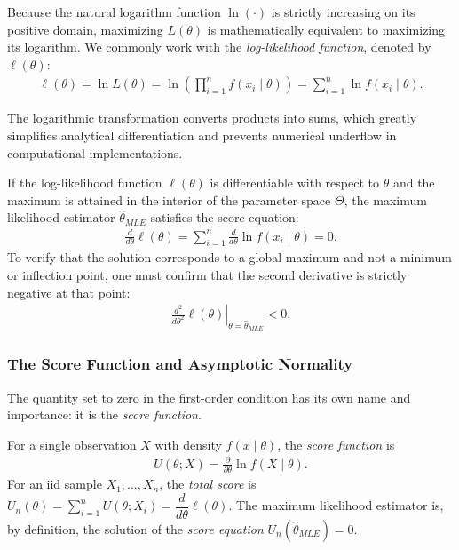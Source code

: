 Because the natural logarithm function $\ln(\cdot)$ is strictly increasing on its positive domain, maximizing $L(\theta)$ is mathematically equivalent to maximizing its logarithm. We commonly work with the \emph{log-likelihood function}, denoted by $\ell(\theta)$:
\begin{align}
	\ell(\theta) = \ln L(\theta) = \ln \left( \prod_{i=1}^n f(x_i \mid \theta) \right) = \sum_{i=1}^n \ln f(x_i \mid \theta).
	\label{eq:log_verosimilitud}
\end{align}

The logarithmic transformation converts products into sums, which greatly simplifies analytical differentiation and prevents numerical underflow in computational implementations.

\begin{teorema}
	If the log-likelihood function $\ell(\theta)$ is differentiable with respect to $\theta$ and the maximum is attained in the interior of the parameter space $\Theta$, the maximum likelihood estimator $\hat{\theta}_{MLE}$ satisfies the score equation:
	\begin{align}
		\frac{d}{d\theta} \ell(\theta) = \sum_{i=1}^n \frac{d}{d\theta} \ln f(x_i \mid \theta) = 0.
		\label{eq:mle_score}
	\end{align}
	To verify that the solution corresponds to a global maximum and not a minimum or inflection point, one must confirm that the second derivative is strictly negative at that point:
	\begin{align}
		\left. \frac{d^2}{d\theta^2} \ell(\theta) \right|_{\theta = \hat{\theta}_{MLE}} < 0.
	\end{align}
\end{teorema}

\subsubsection{The Score Function and Asymptotic Normality}

The quantity set to zero in the first-order condition has its own name and importance: it is the \emph{score function}.

\begin{definicion}
	For a single observation $X$ with density $f(x\mid\theta)$, the \emph{score function} is
	\begin{align}
		U(\theta; X) = \frac{\partial}{\partial\theta}\ln f(X\mid\theta).
	\end{align}
	For an iid sample $X_1,\ldots,X_n$, the \emph{total score} is $U_n(\theta) = \sum_{i=1}^n U(\theta; X_i) = \dfrac{d}{d\theta}\ell(\theta)$. The maximum likelihood estimator is, by definition, the solution of the \emph{score equation} $U_n(\hat\theta_{MLE}) = 0$.
\end{definicion}

